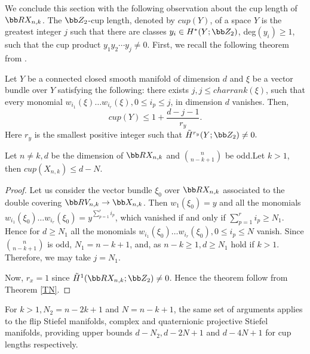 We conclude this section with the following observation about the cup length of $\bb RX_{n, k}$. The $\bb Z_2$-cup length, denoted by $cup(Y)$, of a space $Y$ is the greatest integer $j$ such that there are classes $y_i \in H^*
(Y; \bb Z_2)$, deg$(y_i) \ge 1$, such that the cup product $y_1y_2\cdots y_j\neq 0$.  First, we recall the following theorem from \cite{NT2014}.
\begin{theorem}{\em \cite[Theorem 1.2]{NT2014}}\label{TN}
    Let $Y$ be a connected closed smooth manifold of dimension $d$ and $\xi$ be a vector bundle over $Y$ satisfying the following: there exists $j, j\leq charrank(\xi)$, such that every monomial $w_{i_1}(\xi)\ldots w_{i_r}(\xi), 0\leq i_p\leq j$, in dimension $d$ vanishes. Then, 
                        \[cup(Y)\leq 1+\frac{d-j-1}{r_y}.\]
    Here $r_y$ is the smallest positive integer such that $\tilde{H}^{r_y}(Y; \bb Z_2)\neq 0.$
\end{theorem}
\begin{theorem}
    Let $n\neq k, d$ be the dimension of $\bb RX_{n, k}$ and $\binom{n}{n-k+1}$ be odd.Let $k>1$, then $cup(X_{n,k})\leq d-N$.
\end{theorem}
\begin{proof}
    Let us consider the vector bundle $\xi_0$ over $\bb RX_{n, k}$ associated to the double covering $\bb RV_{n, k}\to \bb X_{n, k}$. Then $w_1(\xi_0)=y$ and all the monomials $w_{i_1}(\xi_0)\ldots w_{i_r}(\xi_0)=y^{\sum_{p=1}^r i_p}$, which vanished if and only if $\sum_{p=1}^r i_p\geq N_1$. Hence for $d\geq N_1$ all the monomials $w_{i_1}(\xi_0)\ldots w_{i_r}(\xi_0), 0\leq i_p\leq N$ vanish. Since $\binom{n}{n-k+1}$ is odd, $N_1=n-k+1$, and, as $n-k\geq 1,d\geq N_1$ hold if $k>1$. Therefore, we may take $j=N_1$.

    Now, $r_x=1$ since $\tilde{H}^1(\bb RX_{n, k}; \bb Z_2)\neq 0$. Hence the theorem follow from Theorem \ref{TN}.
\end{proof}
\begin{remark}
    For $k>1, N_2=n-2k+1$ and $N=n-k+1$, the same set of arguments applies to the flip Stiefel manifolds, complex and quaternionic projective Stiefel manifolds, providing upper bounds $d-N_2, d-2N+1$ and $d-4N+1$ for cup lengths respectively.
\end{remark}
